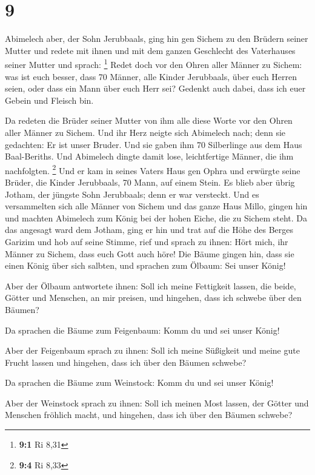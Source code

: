 \hypertarget{section-2}{%
\section{9}\label{section-2}}

 Abimelech aber, der Sohn Jerubbaals, ging hin gen Sichem
zu den Brüdern seiner Mutter und redete mit ihnen und mit dem ganzen
Geschlecht des Vaterhauses seiner Mutter und sprach: \footnote{\textbf{9:1}
  Ri 8,31}  Redet doch vor den Ohren aller Männer zu
Sichem: was ist euch besser, dass 70 Männer, alle Kinder Jerubbaals,
über euch Herren seien, oder dass ein Mann über euch Herr sei? Gedenkt
auch dabei, dass ich euer Gebein und Fleisch bin.

 Da redeten die Brüder seiner Mutter von ihm alle diese
Worte vor den Ohren aller Männer zu Sichem. Und ihr Herz neigte sich
Abimelech nach; denn sie gedachten: Er ist unser Bruder. 
Und sie gaben ihm 70 Silberlinge aus dem Haus Baal-Beriths. Und
Abimelech dingte damit lose, leichtfertige Männer, die ihm nachfolgten.
\footnote{\textbf{9:4} Ri 8,33}  Und er kam in seines
Vaters Haus gen Ophra und erwürgte seine Brüder, die Kinder Jerubbaals,
70 Mann, auf einem Stein. Es blieb aber übrig Jotham, der jüngste Sohn
Jerubbaals; denn er war versteckt.  Und es versammelten
sich alle Männer von Sichem und das ganze Haus Millo, gingen hin und
machten Abimelech zum König bei der hohen Eiche, die zu Sichem steht.
 Da das angesagt ward dem Jotham, ging er hin und trat auf
die Höhe des Berges Garizim und hob auf seine Stimme, rief und sprach zu
ihnen: Hört mich, ihr Männer zu Sichem, dass euch Gott auch höre!
 Die Bäume gingen hin, dass sie einen König über sich
salbten, und sprachen zum Ölbaum: Sei unser König!

 Aber der Ölbaum antwortete ihnen: Soll ich meine
Fettigkeit lassen, die beide, Götter und Menschen, an mir preisen, und
hingehen, dass ich schwebe über den Bäumen?

 Da sprachen die Bäume zum Feigenbaum: Komm du und sei
unser König!

 Aber der Feigenbaum sprach zu ihnen: Soll ich meine
Süßigkeit und meine gute Frucht lassen und hingehen, dass ich über den
Bäumen schwebe?

 Da sprachen die Bäume zum Weinstock: Komm du und sei
unser König!

 Aber der Weinstock sprach zu ihnen: Soll ich meinen Most
lassen, der Götter und Menschen fröhlich macht, und hingehen, dass ich
über den Bäumen schwebe?

